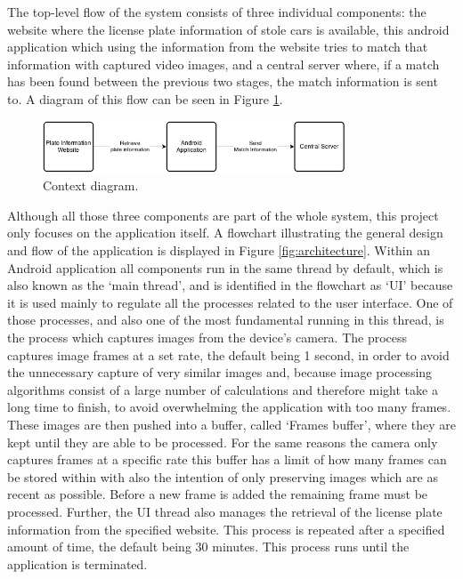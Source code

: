 The top-level flow of the system consists of three individual components: the website where the license plate information of stole cars is available, this android application which using the information from the website tries to match that information with captured video images, and a central server where, if a match has been found between the previous two stages, the match information is sent to. A diagram of this flow can be seen in Figure \ref{fig:top-level}.

\begin{figure}[ht]
    \centering
    \includegraphics[width=0.8\textwidth]{plaatjes/top-down}
    \caption{Context diagram.}
    \label{fig:top-level}
\end{figure}%

Although all those three components are part of the whole system, this project only focuses on the application itself. A flowchart illustrating the general design and flow of the application is displayed in Figure \ref{fig:architecture}. Within an Android application all components run in the same thread by default, which is also known as the `main thread', and is identified in the flowchart as `UI' because it is used mainly to regulate all the processes related to the user interface. One of those processes, and also one of the most fundamental running in this thread, is the process which captures images from the device's camera. The process captures image frames at a set rate, the default being 1 second, in order to avoid the unnecessary capture of very similar images and, because image processing algorithms consist of a large number of calculations and therefore might take a long time to finish, to avoid overwhelming the application with too many frames. These images are then pushed into a buffer, called `Frames buffer', where they are kept until they are able to be processed. For the same reasons the camera only captures frames at a specific rate this buffer has a limit of how many frames can be stored within with also the intention of only preserving images which are as recent as possible. Before a new frame is added the remaining frame must be processed. Further, the UI thread also manages the retrieval of the license plate information from the specified website. This process is repeated after a specified amount of time, the default being 30 minutes. This process runs until the application is terminated.

